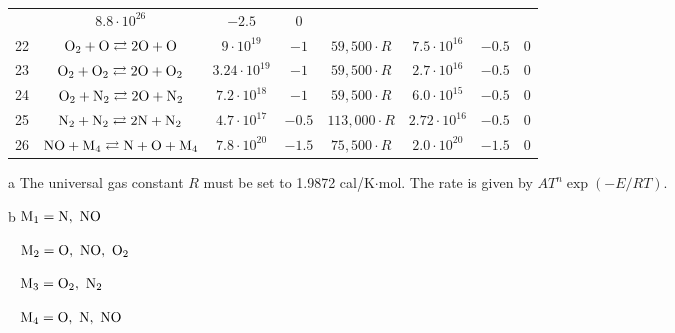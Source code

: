 \documentclass{warpdoc}
\begin{document}
\begin{table}[t]
\begin{center}
\begin{threeparttable}
\begin{tabular}{cccccccc}
                                          & $8.8 \cdot 10^{26}$  & $-2.5$  & 0\\
22 & $\rm O_2 + O \rightleftarrows 2O + O$ & $9 \cdot 10^{19}$ & $-1$ & $59,500\cdot R$ 
                                          & $7.5 \cdot 10^{16}$  & $-0.5$  & 0\\
23 & $\rm O_2 + O_2 \rightleftarrows 2O + O_2$ & $3.24 \cdot 10^{19}$ & $-1$ & $59,500\cdot R$ 
                                          & $2.7 \cdot 10^{16}$  & $-0.5$  & 0\\
24 & $\rm O_2 + N_2 \rightleftarrows 2O + N_2$ & $7.2 \cdot 10^{18}$ & $-1$ & $59,500\cdot R$ 
                                          & $6.0 \cdot 10^{15}$  & $-0.5$  & 0\\
25 & $\rm N_2 + N_2 \rightleftarrows 2N + N_2$ & $4.7 \cdot 10^{17}$ & $-0.5$ & $113,000\cdot R$ 
                                          & $2.72 \cdot 10^{16}$  & $-0.5$  & 0\\
26 & $\rm NO + M_4 \rightleftarrows N + O + M_4$ & $7.8 \cdot 10^{20}$ & $-1.5$ & $75,500\cdot R$ 
                                          & $2.0 \cdot 10^{20}$  & $-1.5$  & 0\\
\bottomrule
\end{tabular}
\begin{tablenotes}
\item[{a}] The universal gas constant $R$ must be set to 1.9872	cal/K$\cdot$mol. The rate is given by $A T^n \exp(-E/RT).$
\item[{b}] $\rm M_1=N,~NO$
\item[~] $\rm M_2=O,~NO,~O_2$
\item[~] $\rm M_3=O_2,~N_2$
\item[~] $\rm M_4=O,~N,~NO$
\end{tablenotes}
\label{tab:dunn-kang}
\end{threeparttable}
\end{center}
\end{table}
%
\end{document}
